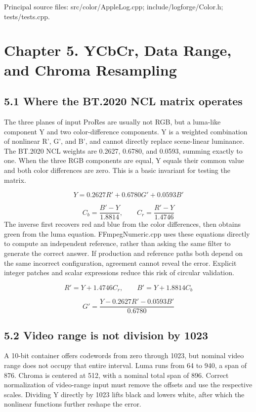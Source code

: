 \documentclass[11pt,a4paper,openany]{book}
\begin{document}
\par\small Principal source files: src/color/AppleLog.cpp; include/logforge/Color.h; tests/tests.cpp.\normalsize

\chapter*{Chapter 5. YCbCr, Data Range, and Chroma Resampling}

\section*{5.1 Where the BT.2020 NCL matrix operates}
The three planes of input ProRes are usually not RGB, but a luma-like component Y and two color-difference components. Y is a weighted combination of nonlinear R', G', and B', and cannot directly replace scene-linear luminance. The BT.2020 NCL weights are 0.2627, 0.6780, and 0.0593, summing exactly to one. When the three RGB components are equal, Y equals their common value and both color differences are zero. This is a basic invariant for testing the matrix.


\begin{equation}
Y=0.2627R'+0.6780G'+0.0593B'
\end{equation}

\begin{equation}
C_b=\frac{B'-Y}{1.8814},\qquad C_r=\frac{R'-Y}{1.4746}
\end{equation}
The inverse first recovers red and blue from the color differences, then obtains green from the luma equation. FFmpegNumeric.cpp uses these equations directly to compute an independent reference, rather than asking the same filter to generate the correct answer. If production and reference paths both depend on the same incorrect configuration, agreement cannot reveal the error. Explicit integer patches and scalar expressions reduce this risk of circular validation.


\begin{equation}
R'=Y+1.4746C_r,\qquad B'=Y+1.8814C_b
\end{equation}

\begin{equation}
G'=\frac{Y-0.2627R'-0.0593B'}{0.6780}
\end{equation}

\section*{5.2 Video range is not division by 1023}
A 10-bit container offers codewords from zero through 1023, but nominal video range does not occupy that entire interval. Luma runs from 64 to 940, a span of 876. Chroma is centered at 512, with a nominal total span of 896. Correct normalization of video-range input must remove the offsets and use the respective scales. Dividing Y directly by 1023 lifts black and lowers white, after which the nonlinear functions further reshape the error.
\end{document}
